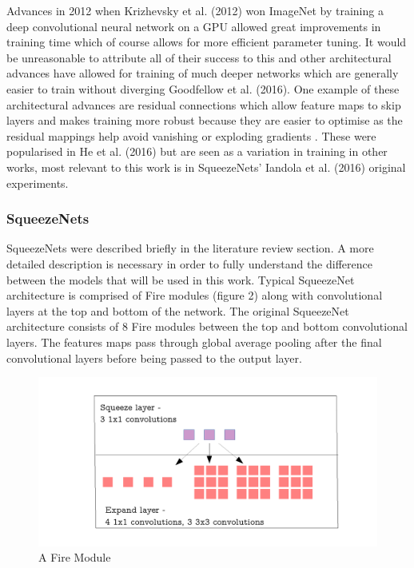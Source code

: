 \documentclass{article}
\begin{document}
Advances in 2012 when  Krizhevsky et al. (2012) won ImageNet by training a deep convolutional neural network on a GPU allowed great improvements in training time which of course allows for more efficient parameter tuning. It would be unreasonable to attribute all of their success to this and other architectural advances have allowed for training of much deeper networks which are generally easier to train without diverging Goodfellow et al. (2016). One example of these architectural advances are residual connections which allow feature maps to skip layers and makes training more robust because they are easier to optimise as the residual mappings help avoid vanishing or exploding gradients . These were popularised in He et al. (2016) but are seen as a variation in training in other works, most relevant to this work is in SqueezeNets' Iandola et al. (2016) original experiments.

\subsubsection{SqueezeNets}
SqueezeNets were described briefly in the literature review section. A more detailed description is necessary in order to fully understand the difference between the models that will be used in this work. Typical SqueezeNet architecture is comprised of Fire modules (figure 2) along with convolutional layers at the top and bottom of the network. The original SqueezeNet architecture consists of 8 Fire modules between the top and bottom convolutional layers. The features maps pass through global average pooling after the final convolutional layers before being passed to the output layer.\\

\begin{figure}[!b]
  \includegraphics[width=\linewidth]{fire.pdf}
  \caption{A Fire Module}
  \label{fig:dwconvolution}
\end{figure}
\end{document}
